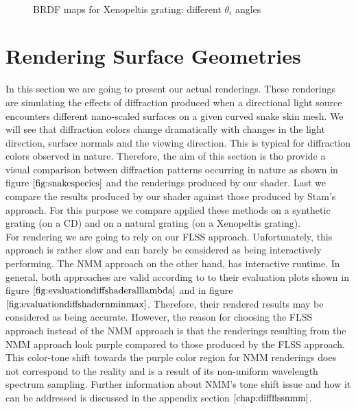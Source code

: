 \begin{figure}[H]
  \centering
~
~
  
\caption[BRDF Map: Varying Viewing Angles]{BRDF maps for Xenopeltis grating: different $\theta_i$ angles}
\label{fig:brdfmapsxenodiffthetaiangles}
\end{figure}

\section{Rendering Surface Geometries}
\label{sec:snakegeomrenderings}
In this section we are going to present our actual renderings. These renderings are simulating the effects of diffraction produced when a directional light source encounters different nano-scaled surfaces on a given curved snake skin mesh. We will see that diffraction colors change dramatically with changes in the light direction, surface normals and the viewing direction. This is typical for diffraction colors observed in nature. Therefore, the aim of this section is tho provide a visual comparison between diffraction patterns occurring in nature as shown in figure $\ref{fig:snakespecies}$ and the renderings produced by our shader. Last we compare the results produced by our shader against those produced by Stam's approach. For this purpose we compare applied these methods on a synthetic grating (on a CD) and on a natural grating (on a Xenopeltis grating). \\

For rendering we are going to rely on our FLSS approach. Unfortunately, this approach is rather slow and can barely be considered as being interactively performing. The NMM approach on the other hand, has interactive runtime. In general, both approaches are valid according to to their evaluation plots shown in figure $\ref{fig:evaluationdiffshaderalllambda}$ and in figure $\ref{fig:evaluationdiffshadernminmax}$. Therefore, their rendered results may be considered as being accurate. However, the reason for choosing the FLSS approach instead of the NMM approach is that the renderings resulting from the NMM approach look purple compared to those produced by the FLSS approach. This color-tone shift towards the purple color region for NMM renderings does not correspond to the reality and is a result of its non-uniform wavelength spectrum sampling. Further information about NMM's tone shift issue and how it can be addressed is discussed in the appendix section $\ref{chap:diffflssnmm}$. \\

